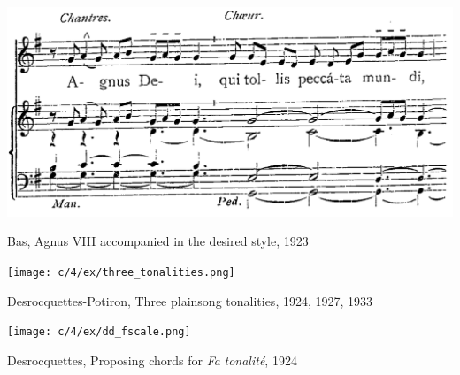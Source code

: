 \vspace*{\fill}

\begin{example}
  \centering
  \includegraphics[width=\linewidth]{c/4/ex/bas_sustained_traite1.png}
  \caption{Bas, Agnus VIII accompanied in the desired style, 1923}
  \label{mus:bas_sustained_traite}
\end{example}

\vspace*{\fill}

%
%


\begin{landscape}

  \vspace*{\fill}

  \begin{example}
    \centering
    \texttt{[image: c/4/ex/three\_tonalities.png]}
    \caption{Desrocquettes-Potiron, Three plainsong tonalities, 1924, 1927, 1933}
    \label{mus:three_tonalities}
  \end{example}

  \vspace*{\fill}

\end{landscape}

\vspace*{\fill}

\begin{example}
  \centering
  \texttt{[image: c/4/ex/dd\_fscale.png]}
  \caption{Desrocquettes, Proposing chords for \emph{Fa} \emph{tonalité}, 1924}
  \label{mus:dd_fscale}
\end{example}

\vspace*{\fill}

